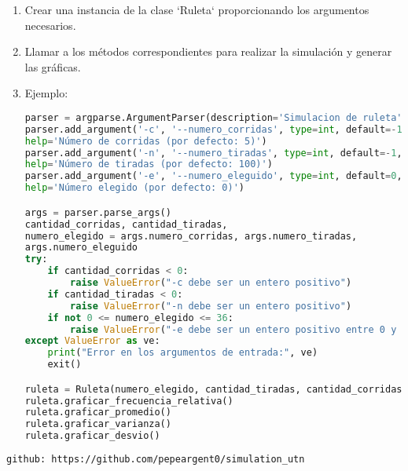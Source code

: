 \documentclass{article}
\begin{document}
\begin{enumerate}
    \item Crear una instancia de la clase `Ruleta` proporcionando los argumentos necesarios.
    \item Llamar a los métodos correspondientes para realizar la simulación y generar las gráficas.
    \item Ejemplo:
    \begin{lstlisting}[language=Python]
parser = argparse.ArgumentParser(description='Simulacion de ruleta')
parser.add_argument('-c', '--numero_corridas', type=int, default=-1,
help='Número de corridas (por defecto: 5)')
parser.add_argument('-n', '--numero_tiradas', type=int, default=-1,
help='Número de tiradas (por defecto: 100)')
parser.add_argument('-e', '--numero_eleguido', type=int, default=0,
help='Número elegido (por defecto: 0)')

args = parser.parse_args()
cantidad_corridas, cantidad_tiradas,
numero_elegido = args.numero_corridas, args.numero_tiradas,
args.numero_eleguido
try:
    if cantidad_corridas < 0:
        raise ValueError("-c debe ser un entero positivo")
    if cantidad_tiradas < 0:
        raise ValueError("-n debe ser un entero positivo")
    if not 0 <= numero_elegido <= 36:
        raise ValueError("-e debe ser un entero positivo entre 0 y 36")
except ValueError as ve:
    print("Error en los argumentos de entrada:", ve)
    exit()

ruleta = Ruleta(numero_elegido, cantidad_tiradas, cantidad_corridas)
ruleta.graficar_frecuencia_relativa()
ruleta.graficar_promedio()
ruleta.graficar_varianza()
ruleta.graficar_desvio()

    \end{lstlisting}
\end{enumerate}
\begin{verbatim}
github: https://github.com/pepeargent0/simulation_utn
\end{verbatim}
\end{document}
